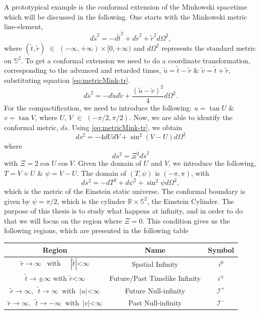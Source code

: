 \medskip

A prototypical example is the conformal extension of the Minkowski spacetime which will be discussed in the following.  One starts with the Minkowski metric line-element,
\begin{equation}\label{eq:metricMink-tr}
	d \tilde{s}^2=-d \tilde{t}^2+d \tilde{r}^2+\tilde{r}^2 d
        \Omega^2,
\end{equation}
where $(\tilde{t}, \tilde{r})$ $\in$ $(-\infty,+\infty) \times[0,+\infty)$ and $d \Omega^2$ represents the standard metric on $\mathbb{S}^2$. To get a conformal extension we need to do a coordinate transformation, corresponding to the advanced and retarded  times, $\tilde{u}=\tilde{t}-\tilde{r}$ $\&$ $\tilde{v}=\tilde{t}+\tilde{r}$,  substituting equation \eqref{eq:metricMink-tr}.
\begin{equation}\label{eq:metricMink-tr1}
	d \tilde{s}^2=-d \tilde{u} d \tilde{v}+\frac{(\tilde{u}-\tilde{v})^2}{4} d \Omega^2.
\end{equation}
For the compactification, we need to introduce the following: $u = \tan U$ $\&$ $v = \tan V$, where $U$, $V$ $\in$ $(- \pi/2, \pi/2)$. Now, we are able to identify the conformal metric,
$ds$. Using \eqref{eq:metricMink-tr}, we obtain
$$d s^2=-4 d U d V+\sin ^2(V-U) d \Omega^2$$ where
$$d s^2=\Xi^2 d \tilde{s}^2$$
with $\Xi=2 \cos U \cos V$. Given the
domain of $U$ and $V$, we introduce the following, $T=V+U$ $\&$ $\psi=V-U$. The domain of $(T, \psi)$ is $(-\pi, \pi)$, with
\begin{equation}\label{eq:metricMink-cf}
	d s^2=-d T^2+d \psi^2+\sin ^2 \psi d \Omega^2,
\end{equation}
which is the metric of the Einstein static universe. The conformal boundary is given by $\psi = \pi/2$, which is the cylinder $\mathbb{R} \times \mathbb{S}^2$, the Einstein Cylinder. The purpose of this thesis is  to study what happens at infinity, and in order to do that we will focus on the region where $\Xi = 0$. This condition gives us the following regions, which are presented in the following table
\begin{center}
    \begin{tabular}{ |c|c|c| }
      \hline
      Region & Name & Symbol \\
     \hline
     $\tilde{r} \rightarrow \infty \enspace \;  \text{with} \; \;\;\;\;
     |\tilde{t}| $<$ \infty$ & Spatial Infinity & $i^{0}$ \\
     \hline 
     $\tilde{t} \rightarrow \pm \infty$  \;\; with \;\; $\tilde{r}$<$\infty$
     \enspace & Future/Past Timelike Infinity & $i^{\pm}$ \\
     \hline
     $\tilde{r} \rightarrow \infty, \enspace \tilde{t} \rightarrow \infty \enspace
     \text{with} \;\; |u|$<$\infty$ &  Future Null-infinity & $\mathscr{I}^+$ \\ 
     \hline
     $\tilde{r} \rightarrow\infty, \enspace \tilde{t} \rightarrow-\infty \;\;
     \text{with} \enspace |v|$<$\infty$ & Past Null-infinity & $\mathscr{I}^-$ \\
     \hline
    \end{tabular}
    \end{center}
